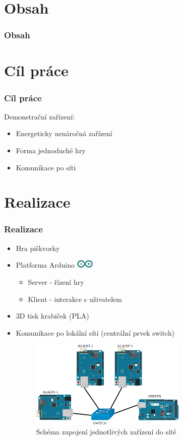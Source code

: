 \documentclass{beamer}
\author[\FirstNameAbbreviated. \LastName]{\FirstName{} \LastName \\ {\color{mygray}\Email}}
\title{\DissertationTitle}
\institute[\FacultyAndUniversityAbbr]{\Department\\ \Faculty\\ \University \\[1em]}
\date{\today}
\begin{document}
{
\beamertemplatenavigationsymbolsempty
\begin{frame}[plain]
\maketitle
\end{frame}
\addtocounter{framenumber}{-1}
}
%
\section{Obsah}
\begin{frame}[allowframebreaks]
\frametitle{Obsah}
\tableofcontents
\end{frame}

\section{Cíl práce}
\begin{frame}
\frametitle{Cíl práce}
Demonstrační zařízení:
\begin{itemize}
\item Energeticky nenáročná zařízení
\item Forma jednoduché hry
\item Komunikace po síti 
\end{itemize}
\end{frame}

\section{Realizace}
\begin{frame}
\frametitle{Realizace}
 \begin{itemize}
 \item Hra piškvorky
 \item Platforma Arduino \includegraphics[height=0.4cm]{img/Arduino.png}
 	\begin{itemize}
 		\item Server - řízení hry
 		\item Klient - interakce s uživatelem
 	\end{itemize}
 \item 3D tisk krabiček (PLA)
 \item Komunikace po lokální síti (centrální prvek switch)
 
 \pause
 \begin{figure}
 \centering
 \includegraphics[width=7.5cm]{img/schema_net.png}
 \caption{Schéma zapojení jednotlivých zařízení do sítě}
 \end{figure}
 \end{itemize}
\end{frame}
\end{document}
